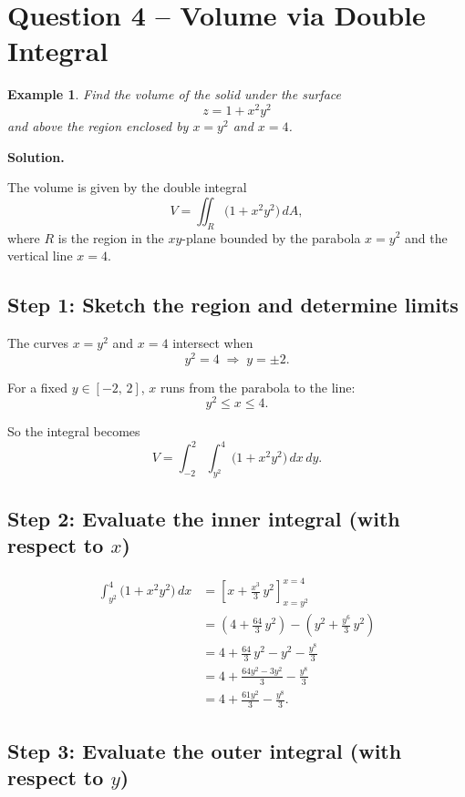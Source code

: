 \documentclass[12pt]{article}
\newtheorem{example}{Example}
\begin{document}
\section{Question 4 -- Volume via Double Integral}

\begin{example}
Find the volume of the solid under the surface
\[
  z = 1 + x^2 y^2
\]
and above the region enclosed by $x = y^2$ and $x = 4$.
\end{example}

\textbf{Solution.}

\medskip
The volume is given by the double integral
\[
  V = \iint_R \bigl(1 + x^2 y^2\bigr)\, dA,
\]
where $R$ is the region in the $xy$-plane bounded by the parabola $x = y^2$
and the vertical line $x = 4$.

\subsection*{Step 1: Sketch the region and determine limits}

The curves $x = y^2$ and $x = 4$ intersect when
\[
  y^2 = 4 \;\Longrightarrow\; y = \pm 2.
\]

For a fixed $y \in [-2,\,2]$, $x$ runs from the parabola to the line:
\[
  y^2 \le x \le 4.
\]

So the integral becomes
\[
  V = \int_{-2}^{2} \int_{y^2}^{4} \bigl(1 + x^2 y^2\bigr)\, dx\, dy.
\]

\subsection*{Step 2: Evaluate the inner integral (with respect to $x$)}

\begin{align*}
  \int_{y^2}^{4} \bigl(1 + x^2 y^2\bigr)\, dx
    &= \left[ x + \frac{x^3}{3}\, y^2 \right]_{x=y^2}^{x=4} \\
    &= \left(4 + \frac{64}{3}\, y^2\right)
       - \left(y^2 + \frac{y^6}{3}\, y^2\right) \\
    &= 4 + \frac{64}{3}\, y^2 - y^2 - \frac{y^8}{3} \\
    &= 4 + \frac{64 y^2 - 3y^2}{3} - \frac{y^8}{3} \\
    &= 4 + \frac{61 y^2}{3} - \frac{y^8}{3}.
\end{align*}

\subsection*{Step 3: Evaluate the outer integral (with respect to $y$)}
\end{document}
